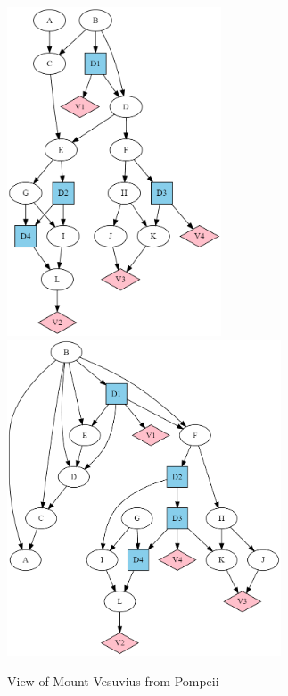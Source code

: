 \begin{itemize}
\begin{figure}[h!]
\centering
\includegraphics[width=2.5in]{influ-diag/sha-fig3.png}
\includegraphics[width=3.2in]{influ-diag/sha-fig4.png}
\caption{View of Mount Vesuvius from
  Pompeii}
\label{fig-sha-fig4}
\end{figure}


\end{itemize}